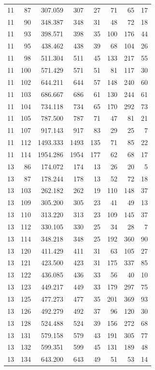 \documentclass[11pt]{article}
\theoremstyle{definition}
\begin{document}
{\begin{longtable}{rrrrrrrr}
11 & 87 & 307.059 & 307 & 27 & 71 & 65 & 17 \\
11 & 90 & 348.387 & 348 & 31 & 48 & 72 & 18 \\
11 & 93 & 398.571 & 398 & 35 & 100 & 176 & 44 \\
11 & 95 & 438.462 & 438 & 39 & 68 & 104 & 26 \\
11 & 98 & 511.304 & 511 & 45 & 133 & 217 & 55 \\
11 & 100 & 571.429 & 571 & 51 & 81 & 117 & 30 \\
11 & 102 & 644.211 & 644 & 57 & 148 & 240 & 60 \\
11 & 103 & 686.667 & 686 & 61 & 130 & 244 & 61 \\
11 & 104 & 734.118 & 734 & 65 & 170 & 292 & 73 \\
11 & 105 & 787.500 & 787 & 71 & 47 & 81 & 21 \\
11 & 107 & 917.143 & 917 & 83 & 29 & 25 & 7 \\
11 & 112 & 1493.333 & 1493 & 135 & 71 & 85 & 22 \\
11 & 114 & 1954.286 & 1954 & 177 & 62 & 68 & 17 \\
13 & 86 & 174.072 & 174 & 13 & 26 & 20 & 5 \\
13 & 87 & 178.244 & 178 & 13 & 52 & 72 & 18 \\
13 & 103 & 262.182 & 262 & 19 & 110 & 148 & 37 \\
13 & 109 & 305.200 & 305 & 23 & 41 & 49 & 13 \\
13 & 110 & 313.220 & 313 & 23 & 109 & 145 & 37 \\
13 & 112 & 330.105 & 330 & 25 & 34 & 28 & 7 \\
13 & 114 & 348.218 & 348 & 25 & 192 & 360 & 90 \\
13 & 120 & 411.429 & 411 & 31 & 63 & 105 & 27 \\
13 & 121 & 423.500 & 423 & 31 & 175 & 337 & 85 \\
13 & 122 & 436.085 & 436 & 33 & 56 & 40 & 10 \\
13 & 123 & 449.217 & 449 & 33 & 179 & 297 & 75 \\
13 & 125 & 477.273 & 477 & 35 & 201 & 369 & 93 \\
13 & 126 & 492.279 & 492 & 37 & 96 & 120 & 30 \\
13 & 128 & 524.488 & 524 & 39 & 156 & 272 & 68 \\
13 & 131 & 579.158 & 579 & 43 & 191 & 305 & 77 \\
13 & 132 & 599.351 & 599 & 45 & 131 & 189 & 48 \\
13 & 134 & 643.200 & 643 & 49 & 51 & 53 & 14 \\

\end{longtable}}
\end{document}
